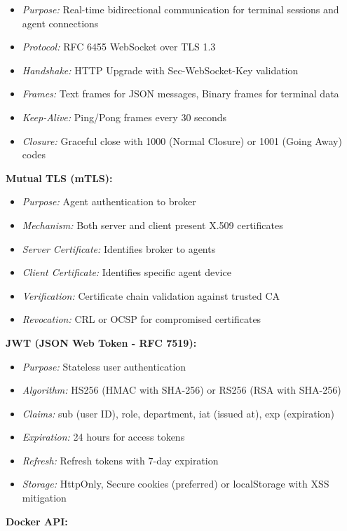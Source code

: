 \documentclass[12pt,a4paper]{article}
\begin{document}
\begin{itemize}
    \item \textit{Purpose:} Real-time bidirectional communication for terminal sessions and agent connections
    \item \textit{Protocol:} RFC 6455 WebSocket over TLS 1.3
    \item \textit{Handshake:} HTTP Upgrade with Sec-WebSocket-Key validation
    \item \textit{Frames:} Text frames for JSON messages, Binary frames for terminal data
    \item \textit{Keep-Alive:} Ping/Pong frames every 30 seconds
    \item \textit{Closure:} Graceful close with 1000 (Normal Closure) or 1001 (Going Away) codes
\end{itemize}

\textbf{Mutual TLS (mTLS):}

\begin{itemize}
    \item \textit{Purpose:} Agent authentication to broker
    \item \textit{Mechanism:} Both server and client present X.509 certificates
    \item \textit{Server Certificate:} Identifies broker to agents
    \item \textit{Client Certificate:} Identifies specific agent device
    \item \textit{Verification:} Certificate chain validation against trusted CA
    \item \textit{Revocation:} CRL or OCSP for compromised certificates
\end{itemize}

\textbf{JWT (JSON Web Token - RFC 7519):}

\begin{itemize}
    \item \textit{Purpose:} Stateless user authentication
    \item \textit{Algorithm:} HS256 (HMAC with SHA-256) or RS256 (RSA with SHA-256)
    \item \textit{Claims:} sub (user ID), role, department, iat (issued at), exp (expiration)
    \item \textit{Expiration:} 24 hours for access tokens
    \item \textit{Refresh:} Refresh tokens with 7-day expiration
    \item \textit{Storage:} HttpOnly, Secure cookies (preferred) or localStorage with XSS mitigation
\end{itemize}
\textbf{Docker API:}
\end{document}
